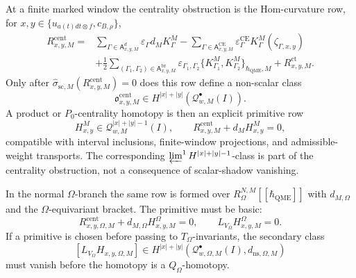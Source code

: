\begin{enumerate}
  At a finite marked window the centrality obstruction is the Hom-curvature
  row, for
  \(x,y\in\{u_{a(t)dt\otimes f},c_{B,\rho}\}\),
  \[
  \begin{aligned}
    R^{\mathrm{cent}}_{x,y,M}
      ={}&
      \sum_{\Gamma\in\mathsf A^{d}_{x,y,M}}
        \varepsilon_\Gamma d_MK^M_\Gamma
      -\sum_{\Gamma\in\mathsf A^{\mathrm{CE}}_{x,y,M}}
        \varepsilon^{\mathrm{CE}}_\Gamma
        K^M_\Gamma(\zeta_{\Gamma,x,y})\\
      &+\frac12
      \sum_{(\Gamma_1,\Gamma_2)\in\mathsf A^{\mathrm{br}}_{x,y,M}}
        \varepsilon_{\Gamma_1,\Gamma_2}
        \{K^M_{\Gamma_1},K^M_{\Gamma_2}\}_{\hbar_{\mathrm{QME}},M}
      +R^{\mathrm{ct}}_{x,y,M}.
  \end{aligned}
  \]
  Only after
  \(\widehat\sigma_{\mathrm{sc},M}(R^{\mathrm{cent}}_{x,y,M})=0\)
  does this row define a non-scalar class
  \[
    \mathfrak o^{\mathrm{cent}}_{x,y,M}
      \in
    H^{|x|+|y|}(\mathcal Q^\bullet_{w,M}(I)).
  \]
  A product or \(P_0\)-centrality homotopy is then an explicit primitive
  row
  \[
    H^M_{x,y}\in\mathcal Q^{|x|+|y|-1}_{w,M}(I),
    \qquad
    R^{\mathrm{cent}}_{x,y,M}+d_MH^M_{x,y}=0,
  \]
  compatible with interval inclusions, finite-window projections, and
  admissible-weight transports.  The corresponding
  \(\varprojlim^1 H^{|x|+|y|-1}\)-class is part of the centrality
  obstruction, not a consequence of scalar-shadow vanishing.

  In the normal \(\Omega\)-branch the same row is formed over
  \(R_\Omega^{N,M}[[\hbar_{\mathrm{QME}}]]\) with \(d_{M,\Omega}\) and the
  \(\Omega\)-equivariant bracket.  The primitive must be basic:
  \[
    R^{\mathrm{cent}}_{x,y,\Omega,M}
      +d_{M,\Omega}H^\Omega_{x,y,M}=0,\qquad
    L_{V_\Omega}H^\Omega_{x,y,M}=0.
  \]
  If a primitive is chosen before passing to \(T_\Omega\)-invariants, the
  secondary class
  \[
    [L_{V_\Omega}H_{x,y,\Omega,M}]
      \in
    H^{|x|+|y|}
      (\mathcal Q^\bullet_{w,\Omega,M}(I),d_{\mathrm{ns},\Omega,M})
  \]
  must vanish before the homotopy is a \(Q_\Omega\)-homotopy.


\end{enumerate}
